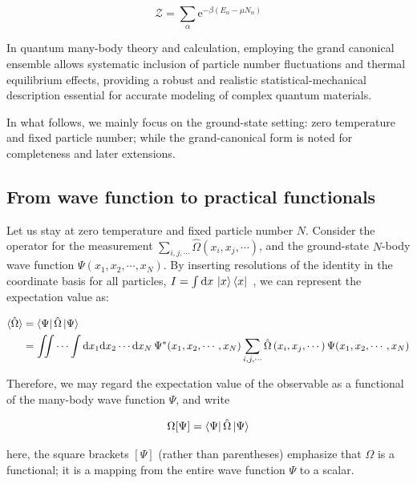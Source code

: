 \begin{equation}
    \mathcal{Z} = \sum_{\alpha} \mathrm{e}^{-\beta(E_{\alpha}-\mu N_{\alpha})}
\label{partition_function}
\end{equation}

In quantum many-body theory and calculation, employing the grand canonical ensemble allows systematic inclusion of particle number fluctuations and thermal equilibrium effects, providing a robust and realistic statistical-mechanical description essential for accurate modeling of complex quantum materials.

In what follows, we mainly focus on the ground-state setting: zero temperature and fixed particle number; while the grand-canonical form is noted for completeness and later extensions.

\subsection{From wave function to practical functionals}

Let us stay at zero temperature and fixed particle number $N$.
Consider the operator for the measurement $\sum_{i,j,\cdots}\hat\Omega\left(x_i,x_j,\cdots\right)$,
and the ground-state $N$-body wave function $\Psi(x_1,x_2,\cdots,x_N)$.
By inserting resolutions of the identity in the coordinate basis for all particles, $I=\int \mathrm{d}x\,\ket{x}\bra{x}$~\cite{shankar2017quantum},
we can represent the expectation value as:

\begin{equation}
\begin{aligned}
    \braket{\hat\Omega} 
    &= \bra{\Psi}\hat\Omega\ket{\Psi} \\
    &= \iint\cdots\int \mathrm{d}x_1\mathrm{d}x_2\cdots\mathrm{d}x_N\,\Psi^*(x_1,x_2,\cdots,x_N)\sum_{i,j,\cdots}\hat\Omega\left(x_i,x_j,\cdots\right)\Psi(x_1,x_2,\cdots,x_N)
\end{aligned}
\label{observables_N-body}
\end{equation}

Therefore, we may regard the expectation value of the observable as a functional of the many-body wave function $\Psi$, and write

\begin{equation}
\Omega[\Psi] = \bra{\Psi}\hat{\Omega}\ket{\Psi}
\label{observables_functional}
\end{equation}

here, the square brackets $[\Psi]$ (rather than parentheses) emphasize that $\Omega$ is a functional; it is a mapping from the entire wave function $\Psi$ to a scalar.

